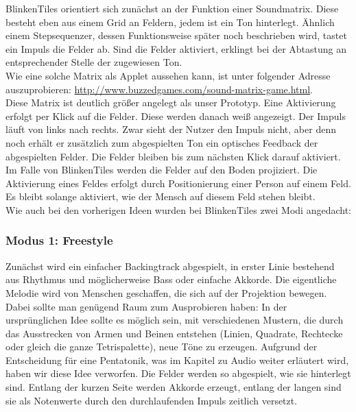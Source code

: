 
BlinkenTiles orientiert sich zunächst an der Funktion einer Soundmatrix. Diese besteht eben aus einem Grid an Feldern, jedem ist ein Ton hinterlegt. Ähnlich einem Stepsequenzer, dessen Funktionsweise später noch beschrieben wird, tastet ein Impuls die Felder ab. Sind die Felder aktiviert, erklingt bei der Abtastung an entsprechender Stelle der zugewiesen Ton.\\
Wie eine solche Matrix als Applet aussehen kann, ist unter folgender Adresse auszuprobieren: \url{http://www.buzzedgames.com/sound-matrix-game.html}.\\
Diese Matrix ist deutlich größer angelegt als unser Prototyp. Eine Aktivierung erfolgt per Klick auf die Felder. Diese werden danach weiß angezeigt. Der Impuls läuft von links nach rechts. Zwar sieht der Nutzer den Impuls nicht, aber denn noch erhält er zusätzlich zum abgespielten Ton ein optisches Feedback der abgespielten Felder. Die Felder bleiben bis zum nächsten Klick darauf aktiviert.\\
Im Falle von BlinkenTiles werden die Felder auf den Boden projiziert. Die Aktivierung eines Feldes erfolgt durch Positionierung einer Person auf einem Feld. Es bleibt solange aktiviert, wie der Mensch auf diesem Feld stehen bleibt.\\

Wie auch bei den vorherigen Ideen wurden bei BlinkenTiles zwei Modi angedacht:

\subsubsection{Modus 1: Freestyle}
Zunächst wird ein einfacher Backingtrack abgespielt, in erster Linie bestehend aus Rhythmus und möglicherweise Bass oder einfache Akkorde. Die eigentliche Melodie wird von Menschen geschaffen, die sich auf der Projektion bewegen. Dabei sollte man genügend Raum zum Ausprobieren haben: In der ursprünglichen Idee sollte es möglich sein, mit verschiedenen Mustern, die durch das Ausstrecken von Armen und Beinen entstehen (Linien, Quadrate, Rechtecke oder gleich die ganze Tetrispalette), neue Töne zu erzeugen. Aufgrund der Entscheidung für eine Pentatonik, was im Kapitel zu Audio weiter erläutert wird, haben wir diese Idee verworfen. Die Felder werden so abgespielt, wie sie hinterlegt sind. Entlang der kurzen Seite werden Akkorde erzeugt, entlang der langen sind sie als Notenwerte durch den durchlaufenden Impuls zeitlich versetzt.

